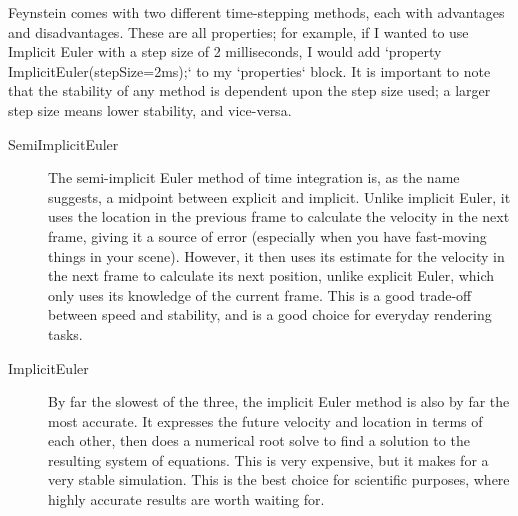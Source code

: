 \documentclass[letterpaper]{article}
\begin{document}
Feynstein comes with two different time-stepping methods, each with
advantages and disadvantages. These are all properties; for example,
if I wanted to use Implicit Euler with a step size of 2 milliseconds,
I would add `property ImplicitEuler(stepSize=2ms);` to my `properties`
block. It is important to note that the stability of any method is
dependent upon the step size used; a larger step size means lower
stability, and vice-versa.

\begin{description}
\item[SemiImplicitEuler] The semi-implicit Euler method of time integration
  is, as the name suggests, a midpoint between explicit and
  implicit. Unlike implicit Euler, it uses the location in the
  previous frame to calculate the velocity in the next frame, giving
  it a source of error (especially when you have fast-moving things in
  your scene). However, it then uses its estimate for the velocity in
  the next frame to calculate its next position, unlike explicit
  Euler, which only uses its knowledge of the current frame. This is a
  good trade-off between speed and stability, and is a good choice for
  everyday rendering tasks.

\item[ImplicitEuler] By far the slowest of the three, the implicit Euler
  method is also by far the most accurate. It expresses the future
  velocity and location in terms of each other, then does a numerical
  root solve to find a solution to the resulting system of
  equations. This is very expensive, but it makes for a very stable
  simulation. This is the best choice for scientific purposes, where
  highly accurate results are worth waiting for.
\end{description}
\end{document}
